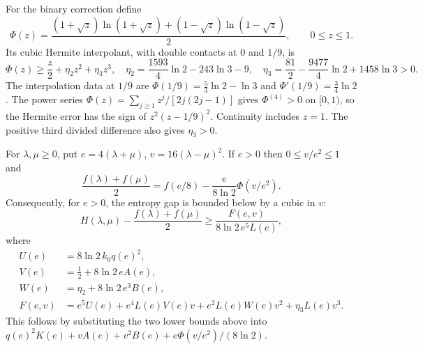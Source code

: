 For the binary correction define
\[
 \Phi(z)=\frac{(1+\sqrt z)\ln(1+\sqrt z)
                    +(1-\sqrt z)\ln(1-\sqrt z)}2,
 \qquad 0\le z\le1.
\]
Its cubic Hermite interpolant, with double contacts at $0$ and $1/9$, is
\begin{equation}\label{eq:seven-joint-binary-minorant}
 \Phi(z)\ge\frac z2+\eta_2z^2+\eta_3z^3,
 \quad
 \eta_2=\frac{1593}4\ln2-243\ln3-9,
 \quad
 \eta_3=\frac{81}2-\frac{9477}4\ln2+1458\ln3>0.
\end{equation}
The interpolation data at $1/9$ are
$\Phi(1/9)=\tfrac53\ln2-\ln3$ and
$\Phi'(1/9)=\tfrac34\ln2$. The power series
$\Phi(z)=\sum_{j\ge1}z^j/[2j(2j-1)]$ gives
$\Phi^{(4)}>0$ on $[0,1)$, so the Hermite error has the sign of
$z^2(z-1/9)^2$. Continuity includes $z=1$.
The positive third divided difference also gives $\eta_3>0$.

For $\lambda,\mu\ge0$, put $e=4(\lambda+\mu)$,
$v=16(\lambda-\mu)^2$. If $e>0$ then $0\le v/e^2\le1$ and
\[
 \frac{f(\lambda)+f(\mu)}2
 =f(e/8)-\frac{e}{8\ln2}\Phi(v/e^2).
\]
Consequently, for $e>0$, the entropy gap is bounded below by a cubic in $v$:
\begin{equation}\label{eq:seven-joint-cubic-reduction}
 H(\lambda,\mu)-\frac{f(\lambda)+f(\mu)}2
 \ge\frac{F(e,v)}{8\ln2\,e^5L(e)},
\end{equation}
where
\begin{align*}
 U(e)&=8\ln2\,k_0q(e)^2,\\
 V(e)&=\tfrac12+8\ln2\,eA(e),\\
 W(e)&=\eta_2+8\ln2\,e^3B(e),\\
 F(e,v)&=e^5U(e)+e^4L(e)V(e)v
                 +e^2L(e)W(e)v^2+\eta_3L(e)v^3.
\end{align*}
This follows by substituting the two lower bounds above into
$q(e)^2K(e)+vA(e)+v^2B(e)+e\Phi(v/e^2)/(8\ln2)$.

